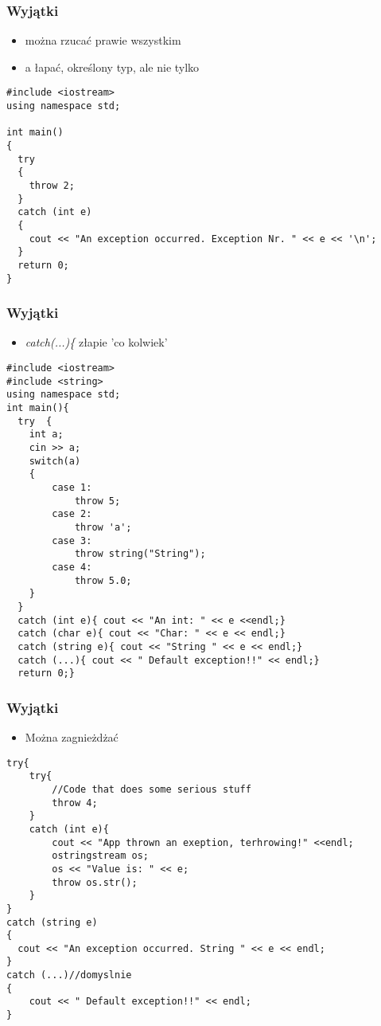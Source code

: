 \documentclass[10pt]{beamer}
\begin{document}
\begin{frame}[fragile]
  \frametitle{Wyjątki}
  
\begin{itemize}
	\item można rzucać prawie wszystkim
	\item a łapać, określony typ, ale nie tylko
\end{itemize}  
  
\begin{lstlisting}
#include <iostream>
using namespace std;

int main()
{
  try
  {
    throw 2;
  }
  catch (int e)
  {
    cout << "An exception occurred. Exception Nr. " << e << '\n';
  }
  return 0;
}
\end{lstlisting}

\end{frame}

\begin{frame}[fragile]
  \frametitle{Wyjątki}
  
\begin{itemize}
	\item \textit{catch(...)\{} złapie 'co kolwiek'
\end{itemize}  
  
\begin{lstlisting}
#include <iostream>
#include <string>
using namespace std;
int main(){
  try  {
  	int a;
  	cin >> a;
  	switch(a)
  	{
  		case 1:
  			throw 5;
  		case 2:
  			throw 'a';
  		case 3:
  			throw string("String");
  		case 4:
  			throw 5.0;
  	}
  }
  catch (int e){ cout << "An int: " << e <<endl;}
  catch (char e){ cout << "Char: " << e << endl;}
  catch (string e){ cout << "String " << e << endl;}
  catch (...){ cout << " Default exception!!" << endl;}
  return 0;}
\end{lstlisting}
\end{frame}

\begin{frame}[fragile]
  \frametitle{Wyjątki}
  
\begin{itemize}
	\item Można zagnieżdżać
\end{itemize}  
  
\begin{lstlisting}
try{
	try{
		//Code that does some serious stuff
		throw 4;
	}
	catch (int e){
		cout << "App thrown an exeption, terhrowing!" <<endl;
		ostringstream os;
		os << "Value is: " << e;
		throw os.str();
	}
}
catch (string e)
{
  cout << "An exception occurred. String " << e << endl;
}
catch (...)//domyslnie
{
	cout << " Default exception!!" << endl;
}
\end{lstlisting}
\end{frame}
\end{document}
